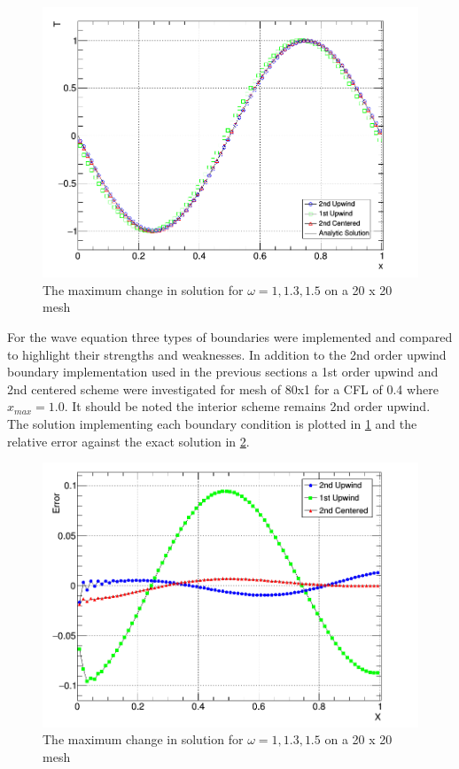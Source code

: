 \documentclass[paper=a4, fontsize=11pt, abstract=on]{scrartcl}
\numberwithin{equation}{section}		%
\numberwithin{figure}{section}			%
\numberwithin{table}{section}				%
\begin{document}
\begin{figure}[H]
\centering
\includegraphics[width=0.8\linewidth]{3a1}
\caption{The maximum change in solution for $\omega = 1, 1.3, 1.5$ on a 20 x 20 mesh}
\label{3a1}
\end{figure}
For the wave equation three types of boundaries were implemented and compared to highlight their strengths and weaknesses. In addition to the 2nd order upwind boundary implementation used in the previous sections a 1st order upwind and 2nd centered scheme were investigated for mesh of 80x1 for a CFL of 0.4 where $x_{max} = 1.0$. It should be noted the interior scheme remains 2nd order upwind. The solution implementing each boundary condition is plotted in \ref{3a1} and the relative error against the exact solution in \ref{3a2}.

\begin{figure}[H]
\centering
\includegraphics[width=0.8\linewidth]{3a2}
\caption{The maximum change in solution for $\omega = 1, 1.3, 1.5$ on a 20 x 20 mesh}
\label{3a2}
\end{figure}
\end{document}
